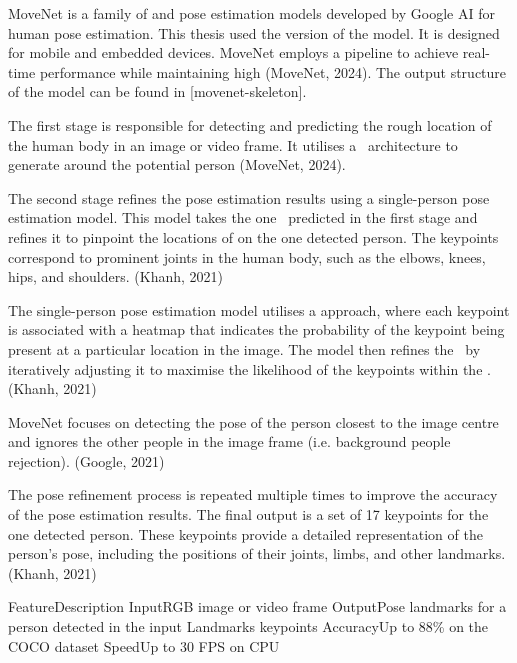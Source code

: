 
MoveNet is a family of  and  pose estimation models developed by Google AI for  human pose estimation. This thesis used the  version of the model. It is designed for mobile and embedded devices. MoveNet employs a  pipeline to achieve real-time performance while maintaining high  (\scc MoveNet, 2024). The output structure of the  model can be found in [movenet-skeleton].

The first stage is responsible for detecting and predicting the rough location of the human body in an image or video frame. It utilises a \SSD\ architecture to generate \pojem{\BBOX} around the potential person (\scc MoveNet, 2024).

The second stage refines the pose estimation results using a single-person pose estimation model. This model takes the one \BBOX\ predicted in the first stage and refines it to pinpoint the locations of  on the one detected person. The keypoints correspond to prominent joints in the human body, such as the elbows, knees, hips, and shoulders. (\scc Khanh, 2021)

The single-person pose estimation model utilises a  approach, where each keypoint is associated with a heatmap that indicates the probability of the keypoint being present at a particular location in the image. The model then refines the \BBOX\ by iteratively adjusting it to maximise the likelihood of the keypoints within the \BBOX. (\scc Khanh, 2021)

MoveNet focuses on detecting the pose of the person closest to the image centre and ignores the other people in the image frame (i.e. background people rejection). (\scc Google, 2021)

The pose refinement process is repeated multiple times to improve the accuracy of the pose estimation results. The final output is a set of 17 keypoints for the one detected person. These keypoints provide a detailed representation of the person's pose, including the positions of their joints, limbs, and other landmarks. (\scc Khanh, 2021)

 \setupTABLE[r][1][style=bold]
 \setupTABLE[c][each][offset=3dd]
 \setupTABLE[frame=off]
 \setupTABLE[r][1][topframe=on,bottomframe=on]
 \setupTABLE[r][6][bottomframe=on]
 \setupTABLE[c][each][leftframe=on]
 \setupTABLE[c][1][leftframe=off]
 \bTR\bTD Feature\eTD\bTD Description\eTD\eTR
 \bTR\bTD Input\eTD\bTD RGB image or video frame\eTD\eTR
 \bTR\bTD Output\eTD\bTD Pose landmarks for a person detected in the input\eTD\eTR
 \bTR\bTD Landmarks\eTD{} keypoints\eTD\eTR
 \bTR\bTD Accuracy\eTD\bTD Up to 88\% on the COCO dataset\eTD\eTR
 \bTR\bTD Speed\eTD\bTD Up to 30 FPS on CPU\eTD\eTR


